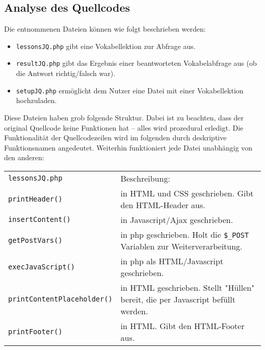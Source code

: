 \documentclass{scrartcl}
\begin{document}
\subsection{Analyse des Quellcodes}
\label{analquell}
Die entnommenen Dateien können wie folgt beschrieben werden:
\begin{itemize}
\item \lstinline`lessonsJQ.php` gibt eine Vokabellektion zur Abfrage aus.
\item \lstinline`resultJQ.php` gibt das Ergebnis einer beantworteten Vokabelabfrage aus (ob die Antwort richtig/falsch war).
\item \lstinline`setupJQ.php` ermöglicht dem Nutzer eine Datei mit einer Vokabellektion hochzuladen.
\end{itemize}
Diese Dateien haben grob folgende Struktur. Dabei ist zu beachten, dass der original Quellcode keine Funktionen hat -- alles wird prozedural erledigt. Die Funktionalität der Quellcodezeilen wird im folgenden durch deskriptive Funktionsnamen angedeutet. Weiterhin funktioniert jede Datei unabhängig von den anderen:
\begin{center}
\begin{tabular}{|p{}|>{\footnotesize} p{}}
\lstinline`lessonsJQ.php` & Beschreibung:\\
\lstinline`printHeader()` & in HTML und CSS geschrieben. Gibt den HTML-Header aus.\\
\lstinline`insertContent()` & in Javascript/Ajax geschrieben. \\
\lstinline`getPostVars()` & in php geschrieben. Holt die \lstinline`$_POST` Variablen zur Weiterverarbeitung.\\
\lstinline`execJavaScript()` & in php als HTML/Javascript geschrieben. \\
\lstinline`printContentPlaceholder()` & in HTML geschrieben. Stellt "Hüllen" bereit, die per Javascript befüllt werden.\\
\lstinline`printFooter()` & in HTML. Gibt den HTML-Footer aus.\\
\end{tabular}
\end{center}
\end{document}
